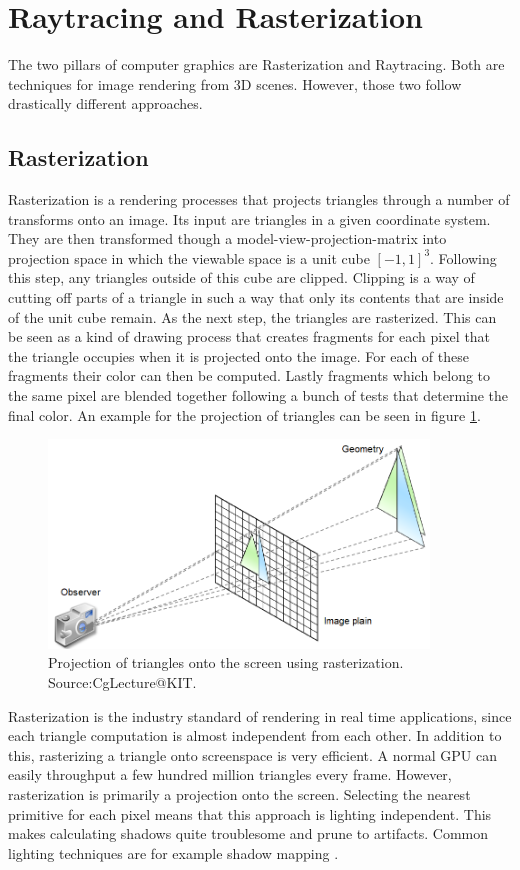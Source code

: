 \section{Raytracing and Rasterization} 
The two pillars of computer graphics are Rasterization and Raytracing. Both are techniques for image rendering from 3D scenes. However, those two follow drastically different approaches.\\
\subsection{Rasterization}
\label{sec:rasterization}
Rasterization is a rendering processes that projects triangles through a number of transforms onto an image. Its input are triangles in a given coordinate system. They are then transformed though a model-view-projection-matrix into projection space in which the viewable space is a unit cube $[-1,1]^3$. Following this step, any triangles outside of this cube are clipped. Clipping is a way of cutting off parts of a triangle in such a way that only its contents that are inside of the unit cube remain. As the next step, the triangles are rasterized. This can be seen as a kind of drawing process that creates fragments for each pixel that the triangle occupies when it is projected onto the image. For each of these fragments their color can then be computed. Lastly fragments which belong to the same pixel are blended together following a bunch of tests that determine the final color. An example for the projection of triangles can be seen in figure \ref{fig:cgRasterization}.
\begin{figure}
    \centering
    \includegraphics[width=0.9\textwidth]{images/showcase/CgRasterization.PNG}
    \caption{Projection of triangles onto the screen using rasterization. Source:CgLecture@KIT.}
    \label{fig:cgRasterization}
\end{figure}
Rasterization is the industry standard of rendering in real time applications, since each triangle computation is almost independent from each other. In addition to this, rasterizing a triangle onto screenspace is very efficient. A normal GPU can easily throughput a few hundred million triangles every frame. However, rasterization is primarily a projection onto the screen. Selecting the nearest primitive for each pixel means that this approach is lighting independent. This makes calculating shadows quite troublesome and prune to artifacts. Common lighting techniques are for example shadow mapping \cite{computergraphicsAndImageProcessing}.\\
